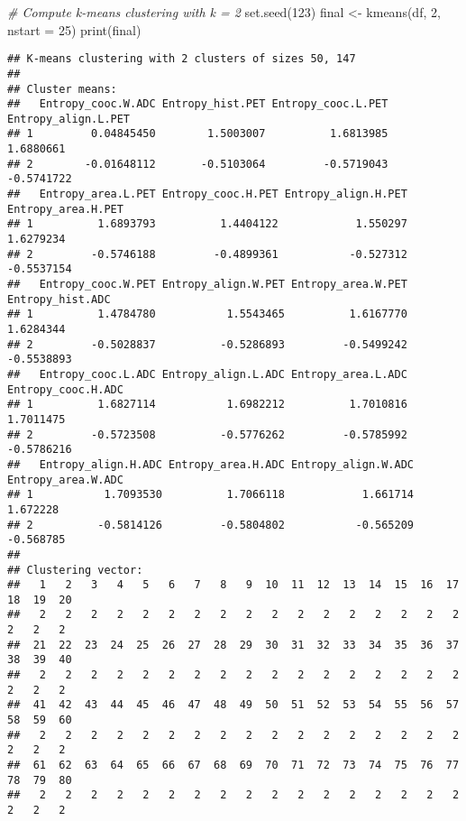 \documentclass[
]{article}
\newenvironment{Shaded}{\begin{snugshade}}{\end{snugshade}}
\newcommand{\AttributeTok}[1]{\textcolor[rgb]{0.77,0.63,0.00}{#1}}
\newcommand{\CommentTok}[1]{\textcolor[rgb]{0.56,0.35,0.01}{\textit{#1}}}
\newcommand{\DecValTok}[1]{\textcolor[rgb]{0.00,0.00,0.81}{#1}}
\newcommand{\FunctionTok}[1]{\textcolor[rgb]{0.00,0.00,0.00}{#1}}
\newcommand{\NormalTok}[1]{#1}
\newcommand{\OtherTok}[1]{\textcolor[rgb]{0.56,0.35,0.01}{#1}}
\begin{document}
\begin{Shaded}
\begin{Highlighting}[]
\CommentTok{\# Compute k{-}means clustering with k = 2}
\FunctionTok{set.seed}\NormalTok{(}\DecValTok{123}\NormalTok{)}
\NormalTok{final }\OtherTok{\textless{}{-}} \FunctionTok{kmeans}\NormalTok{(df, }\DecValTok{2}\NormalTok{, }\AttributeTok{nstart =} \DecValTok{25}\NormalTok{)}
\FunctionTok{print}\NormalTok{(final)}
\end{Highlighting}
\end{Shaded}

\begin{verbatim}
## K-means clustering with 2 clusters of sizes 50, 147
## 
## Cluster means:
##   Entropy_cooc.W.ADC Entropy_hist.PET Entropy_cooc.L.PET Entropy_align.L.PET
## 1         0.04845450        1.5003007          1.6813985           1.6880661
## 2        -0.01648112       -0.5103064         -0.5719043          -0.5741722
##   Entropy_area.L.PET Entropy_cooc.H.PET Entropy_align.H.PET Entropy_area.H.PET
## 1          1.6893793          1.4404122            1.550297          1.6279234
## 2         -0.5746188         -0.4899361           -0.527312         -0.5537154
##   Entropy_cooc.W.PET Entropy_align.W.PET Entropy_area.W.PET Entropy_hist.ADC
## 1          1.4784780           1.5543465          1.6167770        1.6284344
## 2         -0.5028837          -0.5286893         -0.5499242       -0.5538893
##   Entropy_cooc.L.ADC Entropy_align.L.ADC Entropy_area.L.ADC Entropy_cooc.H.ADC
## 1          1.6827114           1.6982212          1.7010816          1.7011475
## 2         -0.5723508          -0.5776262         -0.5785992         -0.5786216
##   Entropy_align.H.ADC Entropy_area.H.ADC Entropy_align.W.ADC Entropy_area.W.ADC
## 1           1.7093530          1.7066118            1.661714           1.672228
## 2          -0.5814126         -0.5804802           -0.565209          -0.568785
## 
## Clustering vector:
##   1   2   3   4   5   6   7   8   9  10  11  12  13  14  15  16  17  18  19  20 
##   2   2   2   2   2   2   2   2   2   2   2   2   2   2   2   2   2   2   2   2 
##  21  22  23  24  25  26  27  28  29  30  31  32  33  34  35  36  37  38  39  40 
##   2   2   2   2   2   2   2   2   2   2   2   2   2   2   2   2   2   2   2   2 
##  41  42  43  44  45  46  47  48  49  50  51  52  53  54  55  56  57  58  59  60 
##   2   2   2   2   2   2   2   2   2   2   2   2   2   2   2   2   2   2   2   2 
##  61  62  63  64  65  66  67  68  69  70  71  72  73  74  75  76  77  78  79  80 
##   2   2   2   2   2   2   2   2   2   2   2   2   2   2   2   2   2   2   2   2 

\end{verbatim}
\end{document}
